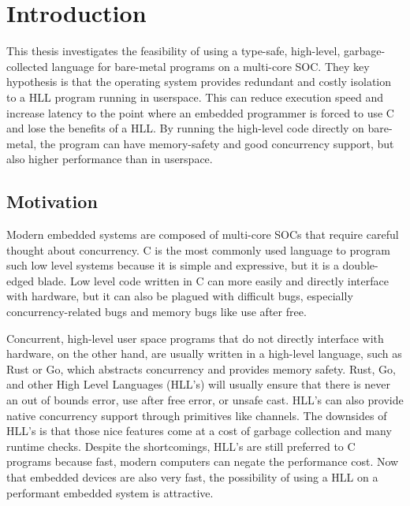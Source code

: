 
\chapter{Introduction}

This thesis investigates the feasibility of using a type-safe,
high-level, garbage-collected language for bare-metal programs
on a multi-core SOC. They key hypothesis is that the operating system
provides redundant and costly isolation to a HLL program running in userspace.
This can reduce execution speed and increase latency to the point where
an embedded programmer is forced to use C and lose the benefits of a HLL.
By running the high-level code directly on bare-metal, the program
can have memory-safety and good concurrency support, but also higher
performance than in userspace.

\section{Motivation}

Modern embedded systems are composed of multi-core SOCs that require
careful thought about concurrency. C is the
most commonly used language to program such low level systems because
it is simple and expressive, but it is
a double-edged blade. Low level code written in C can more easily and
directly interface with hardware, but it can also be plagued with
difficult bugs, especially concurrency-related bugs and memory bugs like
use after free.

Concurrent, high-level user space programs that do not directly interface with
hardware, on the other hand, are usually written in a
high-level language, such as Rust or Go, which abstracts concurrency
and provides memory safety. Rust, Go, and other High Level Languages (HLL's)
will usually ensure that there is never an out of bounds error, use
after free error, or unsafe cast. HLL's can also provide native concurrency
support through primitives like channels. The downsides of HLL's is that those
nice features come at a cost of garbage collection and many runtime checks.
Despite the shortcomings, HLL's are still preferred to C programs because fast,
modern computers can negate the performance cost. Now that embedded devices are also very fast,
the possibility of using a HLL on a performant embedded system is attractive.

